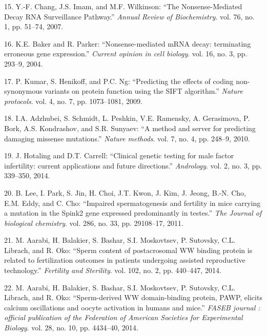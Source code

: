 \documentclass[12pt,twoside]{reedthesis}
\theoremstyle{definition}
\theoremstyle{definition}
\theoremstyle{remark}
\begin{document}
  \hypertarget{ref-Chang2007}{}
  15. Y.-F. Chang, J.S. Imam, and M.F. Wilkinson: ``The Nonsense-Mediated
  Decay RNA Surveillance Pathway.'' \emph{Annual Review of Biochemistry}.
  vol. 76, no. 1, pp. 51--74, 2007.
  
  \hypertarget{ref-Baker2004}{}
  16. K.E. Baker and R. Parker: ``Nonsense-mediated mRNA decay:
  terminating erroneous gene expression.'' \emph{Current opinion in cell
  biology}. vol. 16, no. 3, pp. 293--9, 2004.
  
  \hypertarget{ref-Kumar2009}{}
  17. P. Kumar, S. Henikoff, and P.C. Ng: ``Predicting the effects of
  coding non-synonymous variants on protein function using the SIFT
  algorithm.'' \emph{Nature protocols}. vol. 4, no. 7, pp. 1073--1081,
  2009.
  
  \hypertarget{ref-Adzhubei2010}{}
  18. I.A. Adzhubei, S. Schmidt, L. Peshkin, V.E. Ramensky, A. Gerasimova,
  P. Bork, A.S. Kondrashov, and S.R. Sunyaev: ``A method and server for
  predicting damaging missense mutations.'' \emph{Nature methods}. vol. 7,
  no. 4, pp. 248--9, 2010.
  
  \hypertarget{ref-Hotaling2014}{}
  19. J. Hotaling and D.T. Carrell: ``Clinical genetic testing for male
  factor infertility: current applications and future directions.''
  \emph{Andrology}. vol. 2, no. 3, pp. 339--350, 2014.
  
  \hypertarget{ref-Lee2011}{}
  20. B. Lee, I. Park, S. Jin, H. Choi, J.T. Kwon, J. Kim, J. Jeong, B.-N.
  Cho, E.M. Eddy, and C. Cho: ``Impaired spermatogenesis and fertility in
  mice carrying a mutation in the Spink2 gene expressed predominantly in
  testes.'' \emph{The Journal of biological chemistry}. vol. 286, no. 33,
  pp. 29108--17, 2011.
  
  \hypertarget{ref-Aarabi2014}{}
  21. M. Aarabi, H. Balakier, S. Bashar, S.I. Moskovtsev, P. Sutovsky,
  C.L. Librach, and R. Oko: ``Sperm content of postacrosomal WW binding
  protein is related to fertilization outcomes in patients undergoing
  assisted reproductive technology.'' \emph{Fertility and Sterility}. vol.
  102, no. 2, pp. 440--447, 2014.
  
  \hypertarget{ref-Aarabi2014a}{}
  22. M. Aarabi, H. Balakier, S. Bashar, S.I. Moskovtsev, P. Sutovsky,
  C.L. Librach, and R. Oko: ``Sperm-derived WW domain-binding protein,
  PAWP, elicits calcium oscillations and oocyte activation in humans and
  mice.'' \emph{FASEB journal : official publication of the Federation of
  American Societies for Experimental Biology}. vol. 28, no. 10, pp.
  4434--40, 2014.
  
\end{document}
